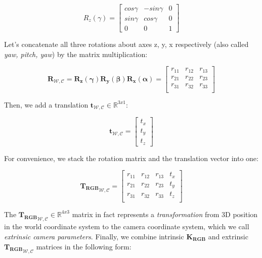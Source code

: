 \documentclass[a4paper]{report}
\numberwithin{figure}{section}
\newcommand{\R}{\mathbb{R}}
\begin{document}
\begin{equation}
  R_z(\gamma) = 
  \begin{bmatrix}
    cos\gamma & -sin\gamma & 0\\
    sin\gamma & cos\gamma & 0\\
    0 & 0 & 1
  \end{bmatrix}\label{eq:rot_matrx_z}
\end{equation} 

Let's concatenate all three rotations about axes z, y, x respectively (also 
called \textit{yaw, pitch, yaw}) by the matrix multiplication:

\begin{equation}
  \mathbf{R}_{\mathcal{W}, \mathcal{C}} = 
  \mathbf{R_z(\gamma)}\mathbf{R_y(\beta)}\mathbf{R_x(\alpha)}
  =
  \begin{bmatrix}
    r_{11} & r_{12} & r_{13}\\
    r_{21} & r_{22} & r_{23}\\
    r_{31} & r_{32} & r_{33}\\
  \end{bmatrix}\label{eq:rot_matrix_derivation}
\end{equation} 

Then, we add a translation $\mathbf{t}_{\mathcal{W}, \mathcal{C}} \in 
\R^{3x1}$:

\begin{equation}
  \mathbf{t}_{\mathcal{W}, \mathcal{C}} = 
  \begin{bmatrix}
    t_x \\ t_y \\ t_z
  \end{bmatrix}\label{eq:translation}
\end{equation} 

For convenience, we stack the rotation matrix and the translation vector into 
one:

\begin{equation}
  {\mathbf{T_{RGB}}}_{\mathcal{W}, \mathcal{C}} =
  \begin{bmatrix}
    r_{11} & r_{12} & r_{13} & t_x\\
    r_{21} & r_{22} & r_{23} & t_y\\
    r_{31} & r_{32} & r_{33} & t_z\\
  \end{bmatrix}\label{eq:transformation_matrix}
\end{equation} 

The ${\mathbf{T_{RGB}}}_{\mathcal{W}, \mathcal{C}} \in \R^{4x3}$ matrix in 
fact represents a 
\textit{transformation} from 3D position in the world coordinate system to the 
camera coordinate system, which we call \textit{extrinsic camera parameters}.  
Finally, we combine intrinsic $\mathbf{K_{RGB}}$ and extrinsic 
${\mathbf{T_{RGB}}}_{\mathcal{W}, \mathcal{C}}$ matrices in the following form:
\end{document}
